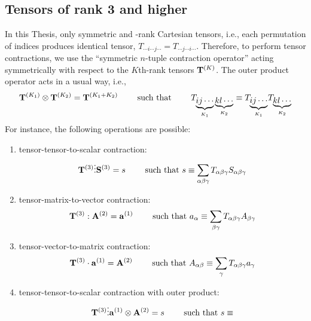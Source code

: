 \documentclass[a4paper,titlepage,twoside,fleqn,12pt]{book}
\begin{document}
\begin{appendices}
\section{Tensors of rank 3 and higher}

In this Thesis, only symmetric  and \hyp{}rank Cartesian tensors,
i.e., each permutation of indices produces identical tensor, 
$T_{\cdots i\cdots j\cdots} = T_{\cdots j\cdots i\cdots}$.
Therefore, to perform tensor contractions, 
we use the ``symmetric $n$-tuple contraction operator''
acting symmetrically
with respect to the $K$th-rank tensors ${\bf T}^{(K)}$.
The outer product operator acts in a usual way, i.e.,
%
\begin{equation}
 {\bf T}^{(K_1)} \otimes {\bf T}^{(K_2)}  = {\bf T}^{(K_1+K_2)}
 \qquad\text{ such that } 
 \qquad T_{\underbrace{ij\cdots}_{K_1}\underbrace{kl\cdots}_{K_2}} \equiv 
 T_{\underbrace{ij\cdots}_{K_1}} T_{\underbrace{kl\cdots}_{K_2}} 
\end{equation}
%
For instance, the following operations are possible:
%
\begin{enumerate}
 \item tensor\hyp{}tensor\hyp{}to\hyp{}scalar contraction:
   \begin{equation}
     {\bf T}^{(3)} \vdots {\bf S}^{(3)}  = s
     \qquad\text{ such that } 
     s \equiv 
     \sum_{\alpha\beta\gamma} T_{\alpha\beta\gamma} S_{\alpha\beta\gamma} 
   \end{equation}
 \item tensor\hyp{}matrix\hyp{}to\hyp{}vector contraction:
   \begin{equation}
     {\bf T}^{(3)} : {\bf A}^{(2)}  = {\bf a}^{(1)}
     \qquad\text{ such that } 
     a_\alpha \equiv 
     \sum_{\beta\gamma} T_{\alpha\beta\gamma} A_{\beta\gamma} 
   \end{equation}
 \item tensor\hyp{}vector\hyp{}to\hyp{}matrix contraction:
   \begin{equation}
     {\bf T}^{(3)} \cdot {\bf a}^{(1)}  = {\bf A}^{(2)}
     \qquad\text{ such that } 
     A_{\alpha\beta} \equiv 
     \sum_{\gamma} T_{\alpha\beta\gamma} a_{\gamma} 
   \end{equation}
 \item tensor\hyp{}tensor\hyp{}to\hyp{}scalar contraction with outer product:
   \begin{equation}
     {\bf T}^{(3)} \vdots {\bf a}^{(1)} \otimes {\bf A}^{(2)}  = s
     \qquad\text{ such that } 
     s \equiv 

\end{equation}
\end{enumerate}
\end{appendices}
\end{document}
